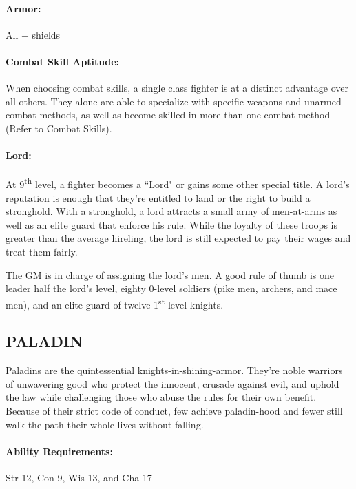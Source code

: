 \begin{multicols}{2}
\paragraph{Armor:} All + shields

\paragraph{Combat Skill Aptitude:} When choosing combat skills, a single class fighter is at a distinct advantage over all others.  They alone are able to specialize with specific weapons and unarmed combat methods, as well as become skilled in more than one combat method (Refer to Combat Skills).

\paragraph{Lord:} At 9\textsuperscript{th} level, a fighter becomes a ``Lord" or gains some other special title.  A lord's reputation is enough that they're entitled to land or the right to build a stronghold.  With a stronghold, a lord attracts a small army of men-at-arms as well as an elite guard that enforce his rule.  While the loyalty of these troops is greater than the average hireling, the lord is still expected to pay their wages and treat them fairly.  

The GM is in charge of assigning the lord's men.  A good rule of thumb is one leader half the lord's level, eighty 0-level soldiers (pike men, archers, and mace men), and an elite guard of twelve 1\textsuperscript{st} level knights.   

 
\subsection{PALADIN}

Paladins are the quintessential knights-in-shining-armor.  They're noble warriors of unwavering good who protect the innocent, crusade against evil, and uphold the law while challenging those who abuse the rules for their own benefit.  Because of their strict code of conduct, few achieve paladin-hood and fewer still walk the path their whole lives without falling.

\paragraph{Ability Requirements:} Str 12, Con 9, Wis 13, and Cha 17


\end{multicols}
